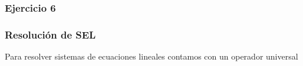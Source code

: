 \documentclass[12pt]{beamer}
\begin{document}
\begin{large}
\begin{frame}
\frametitle{Ejercicio 6}
\end{frame}


\begin{frame}
\frametitle{Resolución de SEL}

Para resolver sistemas de ecuaciones lineales contamos con un operador
universal
\testcode
\end{frame}

\end{large}
\end{document}
